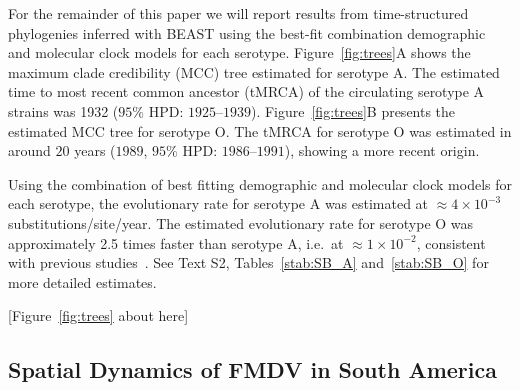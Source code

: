 \documentclass[10pt]{article}
\begin{document}
For the remainder of this paper we will report results from  time-structured phylogenies inferred with BEAST using the best-fit combination demographic and molecular clock models for each serotype.
Figure~\ref{fig:trees}A shows the maximum clade credibility (MCC) tree estimated for serotype A.
The estimated time to most recent common ancestor (tMRCA) of the circulating serotype A strains was 1932 ($95\%$ HPD: $1925$--$1939$).
Figure~\ref{fig:trees}B presents the estimated MCC tree for serotype O.
The tMRCA for serotype O was estimated in around $20$ years ($1989$, $95\%$ HPD: $ 1986$--$1991$), showing a more recent origin. 

Using the combination of best fitting demographic and molecular clock models for each serotype, the evolutionary rate for serotype A was estimated at $\approx 4 \times 10^{-3}$ substitutions/site/year.
The estimated evolutionary rate for serotype O was approximately 2.5 times faster than serotype A, i.e.~at $\approx 1 \times 10^{-2}$, consistent with previous studies~\cite{tully, Carvalho2013, Muellner2011}.
See Text S2, Tables~\ref{stab:SB_A} and~\ref{stab:SB_O} for more detailed estimates.

\begin{center}
 [Figure~\ref{fig:trees} about here]
\end{center}


\subsection*{Spatial Dynamics of FMDV in South America}
\end{document}
